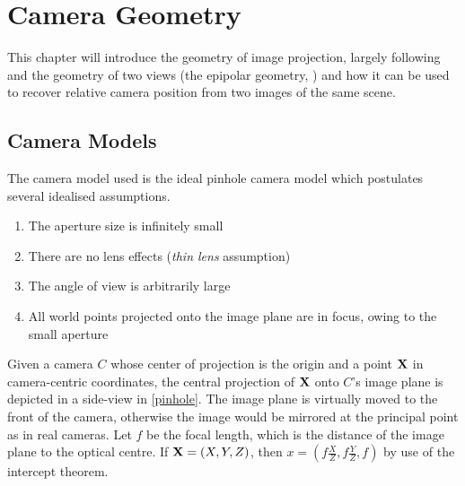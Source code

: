 \chapter{Camera Geometry}

This chapter will introduce the geometry of image projection, largely following
\citep[chapters 6,7]{h&z2004} and the geometry of two views (the epipolar
geometry, \citet[ch. 5.1]{ma2003}) and
how it can be used to recover relative camera position from two images of the
same scene. 

\section{Camera Models}

The camera model used is the ideal pinhole camera model which postulates several
idealised assumptions.
\begin{enumerate}
   \item The aperture size is infinitely small
   \item There are no lens effects (\emph{thin lens} assumption)
   \item The angle of view is arbitrarily large
   \item All world points projected onto the image plane are in focus, owing to
      the small aperture
\end{enumerate}


Given a camera $C$ whose center of projection is the origin and a point
$\mathbf{X}$ in camera-centric coordinates, the central projection of
$\mathbf{X}$ onto $C$'s image plane is depicted in a side-view in
\autoref{pinhole}.  The image plane is virtually moved to the front of the
camera, otherwise the image would be mirrored at the principal point as in real
cameras.  Let $f$ be the focal length, which is the distance of the image plane
to the optical centre.  If $\mathbf{X} = (X,Y,Z)$, then $x=\left(f \frac{X}{Z},
f \frac{Y}{Z}, f\right)$ by use of the intercept theorem.%


